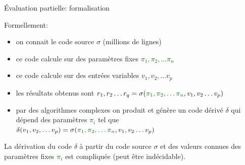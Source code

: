 \documentclass[final,a4,xcolor={svgnames,dvipsnames}]{beamer}
\begin{document}
 \begin{frame}{Évaluation partielle: formalisation}
   
Formellement:

\begin{itemize}
\item on connait le code source $\sigma$ (millions de lignes)
\item ce code calcule sur des paramètres fixes \textcolor{DarkGreen}{$\pi_1, \pi_2, \ldots \pi_n$}
\item ce code calcule sur des entrées variables $v_1, v_2, \ldots v_p$
  
\item les résultats obtenus sont $r_1, r_2 \ldots r_q = \sigma (\textcolor{DarkGreen}{\pi_1, \pi_2, \ldots \pi_n}, v_1, v_2 \ldots v_p)$
\item par des algorithmes complexes on produit et génère un code
  dérivé $\delta$ qui dépend des paramètres \textcolor{DarkGreen}{$\pi_i$} tel que
  $\delta(v_1, v_2, \ldots v_p) = \sigma(\color{DarkGreen}{\pi_1, \pi_2, \ldots \pi_n}\color{black}{,  v_1, v_2 \ldots v_p)}$
\end{itemize}

La dérivation du code $\delta$ à partir du code source $\sigma$ et des
valeurs connues des paramètres fixes \textcolor{DarkGreen}{$\pi_i$}
est compliquée (peut être indécidable).
 \end{frame}

 
\end{document}
